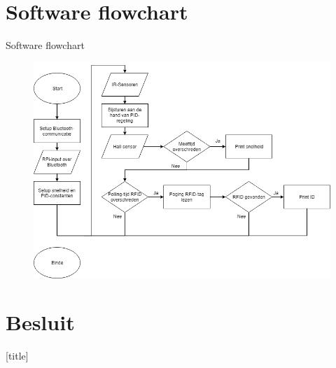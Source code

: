 \documentclass[t,12pt,english
\ifx\beamermode\undefined\else,\beamermode\fi
]{beamer}
\begin{document}
\section{Software flowchart}
\begin{frame}{Software flowchart}
\begin{figure}[H]
	\centering
	\includegraphics[width=\textwidth,height=0.8\textheight,keepaspectratio]{arduinoflowchartpresentatie.png}
\end{figure}
\end{frame}


\section{Besluit}
\title{}
[title]

\begin{frame}
\titlepage
\end{frame}

\usedefaultcanvas
\end{document}
